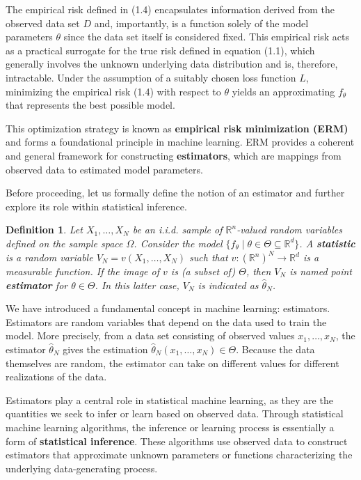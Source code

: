 \documentclass{report}
\newtheorem{definition}{Definition}[chapter]
\begin{document}
The empirical risk defined in (1.4) encapsulates information derived from the observed data set $D$ and, importantly, is a function solely of the model parameters $\theta$ since the data set itself is considered fixed. This empirical risk acts as a practical surrogate for the true risk defined in equation (1.1), which generally involves the unknown underlying data distribution and is, therefore, intractable. Under the assumption of a suitably chosen loss function $L$, minimizing the empirical risk (1.4) with respect to $\theta$ yields an approximating $f_\theta$ that represents the best possible model.

This optimization strategy is known as \textbf{empirical risk minimization (ERM)} and forms a foundational principle in machine learning. ERM provides a coherent and general framework for constructing \textbf{estimators}, which are mappings from observed data to estimated model parameters.

Before proceeding, let us formally define the notion of an estimator and further explore its role within statistical inference.

\begin{definition}
Let $X_1,\dots,X_N$ be an i.i.d. sample of $\mathbb{R}^n$-valued random variables defined on the sample space $\Omega$. Consider the model $\{f_\theta \mid \theta \in \Theta \subseteq \mathbb{R}^d \}$. A \textbf{statistic} is a random variable $V_N = v(X_1,\dots,X_N)$ such that $v : (\mathbb{R}^n)^N \to \mathbb{R}^d$ is a measurable function. If the image of $v$ is (a subset of) $\Theta$, then $V_N$ is named point \textbf{estimator} for $\theta \in \Theta$. In this latter case, $V_N$ is indicated as $\hat{\theta}_N$.
\end{definition}

We have introduced a fundamental concept in machine learning: estimators. Estimators are random variables that depend on the data used to train the model. More precisely, from a data set consisting of observed values $x_1,\dots,x_N$, the estimator $\hat{\theta}_N$ gives the estimation $\hat{\theta}_N(x_1,\dots,x_N) \in \Theta$. Because the data themselves are random, the estimator can take on different values for different realizations of the data.

Estimators play a central role in statistical machine learning, as they are the quantities we seek to infer or learn based on observed data. Through statistical machine learning algorithms, the inference or learning process is essentially a form of \textbf{statistical inference}. These algorithms use observed data to construct estimators that approximate unknown parameters or functions characterizing the underlying data-generating process.
\end{document}
